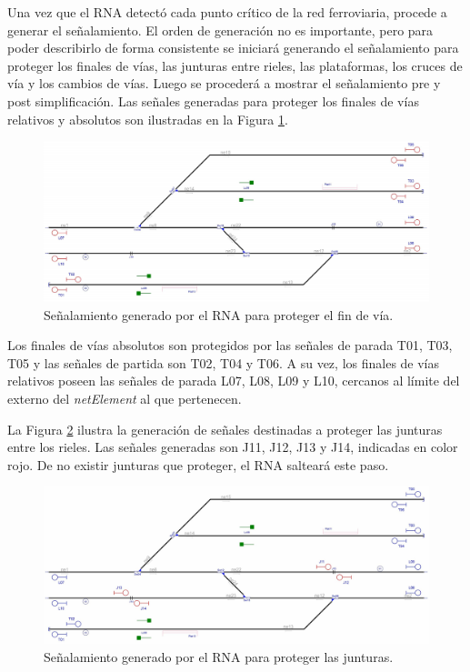	Una vez que el RNA detectó cada punto crítico de la red ferroviaria, procede a generar el señalamiento. El orden de generación no es importante, pero para poder describirlo de forma consistente se iniciará generando el señalamiento para proteger los finales de vías, las junturas entre rieles, las plataformas, los cruces de vía y los cambios de vías. Luego se procederá a mostrar el señalamiento pre y post simplificación. Las señales generadas para proteger los finales de vías relativos y absolutos son ilustradas en la Figura \ref{fig:EJ1_3}.
	
	\begin{figure}[H]
		\centering
		\includegraphics[width=1\textwidth]{resultados-obtenidos/ejemplo1/images/1_step1.png}
		\centering\caption{Señalamiento generado por el RNA para proteger el fin de vía.}
		\label{fig:EJ1_3}
	\end{figure}
	
	Los finales de vías absolutos son protegidos por las señales de parada T01, T03, T05 y las señales de partida son T02, T04 y T06. A su vez, los finales de vías relativos poseen las señales de parada L07, L08, L09 y L10, cercanos al límite del externo del \textit{netElement} al que pertenecen.
	
	La Figura \ref{fig:EJ1_4} ilustra la generación de señales destinadas a proteger las junturas entre los rieles. Las señales generadas son J11, J12, J13 y J14, indicadas en color rojo. De no existir junturas que proteger, el RNA salteará este paso.
	
	\begin{figure}[H]
		\centering
		\includegraphics[width=1\textwidth]{resultados-obtenidos/ejemplo1/images/1_step2.png}
		\centering\caption{Señalamiento generado por el RNA para proteger las junturas.}
		\label{fig:EJ1_4}
	\end{figure}
	

